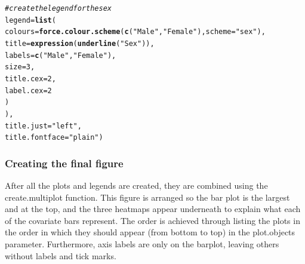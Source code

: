 \documentclass[letterpaper]{article}\usepackage[]{graphicx}\usepackage[]{color}
\makeatletter
\newcommand{\hlnum}[1]{\textcolor[rgb]{0.686,0.059,0.569}{#1}}%
\newcommand{\hlstr}[1]{\textcolor[rgb]{0.192,0.494,0.8}{#1}}%
\newcommand{\hlcom}[1]{\textcolor[rgb]{0.678,0.584,0.686}{\textit{#1}}}%
\newcommand{\hlstd}[1]{\textcolor[rgb]{0.345,0.345,0.345}{#1}}%
\newcommand{\hlkwc}[1]{\textcolor[rgb]{0.333,0.667,0.333}{#1}}%
\newcommand{\hlkwd}[1]{\textcolor[rgb]{0.737,0.353,0.396}{\textbf{#1}}}%
\newenvironment{kframe}{%
 \def\at@end@of@kframe{}%
 \ifinner\ifhmode%
  \def\at@end@of@kframe{\end{minipage}}%
  \begin{minipage}{\columnwidth}%
 \fi\fi%
 \def\FrameCommand##1{\hskip\@totalleftmargin \hskip-\fboxsep
 \colorbox{shadecolor}{##1}\hskip-\fboxsep
     \hskip-\linewidth \hskip-\@totalleftmargin \hskip\columnwidth}%
 \MakeFramed {\advance\hsize-\width
   \@totalleftmargin\z@ \linewidth\hsize
   \@setminipage}}%
 {\par\unskip\endMakeFramed%
 \at@end@of@kframe}
\newenvironment{knitrout}{}{} %
\makeatother
\begin{document}
\begin{knitrout}
\begin{kframe}
\begin{alltt}
       \hlcom{# create the legend for the sex}
       \hlkwc{legend} \hlstd{=} \hlkwd{list}\hlstd{(}
               \hlkwc{colours} \hlstd{=} \hlkwd{force.colour.scheme}\hlstd{(}\hlkwd{c}\hlstd{(}\hlstr{"Male"}\hlstd{,} \hlstr{"Female"}\hlstd{),}\hlkwc{scheme} \hlstd{=} \hlstr{"sex"}\hlstd{),}
               \hlkwc{title} \hlstd{=} \hlkwd{expression}\hlstd{(}\hlkwd{underline}\hlstd{(}\hlstr{"Sex"}\hlstd{)),}
               \hlkwc{labels} \hlstd{=} \hlkwd{c}\hlstd{(}\hlstr{"Male"}\hlstd{,} \hlstr{"Female"}\hlstd{),}
               \hlkwc{size} \hlstd{=} \hlnum{3}\hlstd{,}
               \hlkwc{title.cex} \hlstd{=} \hlnum{2}\hlstd{,}
               \hlkwc{label.cex} \hlstd{=} \hlnum{2}
               \hlstd{)}
       \hlstd{),}
       \hlkwc{title.just} \hlstd{=} \hlstr{"left"}\hlstd{,}
       \hlkwc{title.fontface} \hlstd{=} \hlstr{"plain"}\hlstd{)}
\end{alltt}
\end{kframe}
\end{knitrout}

\subsubsection{Creating the final figure}
After all the plots and legends are created, they are combined using the create.multiplot function. This figure is arranged so the bar plot is the largest and at the top, and the three heatmaps appear underneath to explain what each of the covariate bars represent. The order is achieved through listing the plots in the order in which they should appear (from bottom to top) in the plot.objects parameter. Furthermore, axis labels are only on the barplot, leaving others without labels and tick marks.
\end{document}
